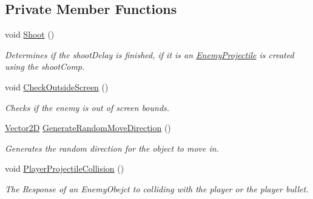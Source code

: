\subsection*{Private Member Functions}
\begin{DoxyCompactItemize}
\item 
\mbox{\label{class_enemy_ab526cfaf13910e15ca1e5e84ef230dd1}} 
void \hyperlink{class_enemy_ab526cfaf13910e15ca1e5e84ef230dd1}{Shoot} ()
\begin{DoxyCompactList}\small\item\em Determines if the shoot\+Delay is finished, if it is an \hyperlink{class_enemy_projectile}{Enemy\+Projectile} is created using the shoot\+Comp. \end{DoxyCompactList}\item 
\mbox{\label{class_enemy_a06fafdc67bd76334adb9d47f73f15aff}} 
void \hyperlink{class_enemy_a06fafdc67bd76334adb9d47f73f15aff}{Check\+Outside\+Screen} ()
\begin{DoxyCompactList}\small\item\em Checks if the enemy is out of screen bounds. \end{DoxyCompactList}\item 
\hyperlink{class_vector2_d}{Vector2D} \hyperlink{class_enemy_aa40cb40a3a2d83e82e02ee5cfbb9ee96}{Generate\+Random\+Move\+Direction} ()
\begin{DoxyCompactList}\small\item\em Generates the random direction for the object to move in. \end{DoxyCompactList}\item 
\mbox{\label{class_enemy_a9c4e7e1c9f79650d1f0dd3c72ae9c82d}} 
void \hyperlink{class_enemy_a9c4e7e1c9f79650d1f0dd3c72ae9c82d}{Player\+Projectile\+Collision} ()
\begin{DoxyCompactList}\small\item\em The Response of an Enemy\+Obejct to colliding with the player or the player bullet. \end{DoxyCompactList}\end{DoxyCompactItemize}
